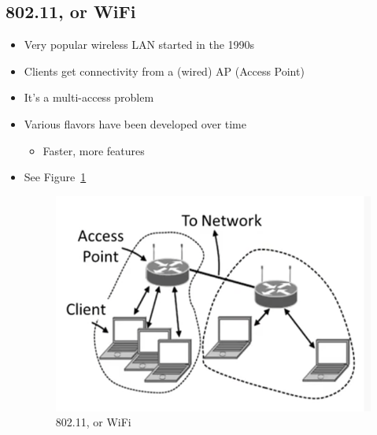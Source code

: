 \documentclass[12pt]{ctexart}   %
\begin{document}
	\subsection{ 802.11, or WiFi }
	\begin{itemize}
		\item Very popular wireless LAN started in the 1990s
		\item Clients get connectivity from a (wired) AP (Access Point)
		\item It's a multi-access problem
		\item Various flavors have been developed over time
		\begin{itemize}
			\item Faster, more features
		\end{itemize}
		
		\item See Figure~\ref{fig:3-6-9}
		
		\begin{figure}[h!] %
		\centering
		 \includegraphics[scale=0.7]{images/3-6-9}
		\caption{ 802.11, or WiFi }
		 \label{fig:3-6-9}
		 \end{figure}
	\end{itemize}
	
\end{document}
